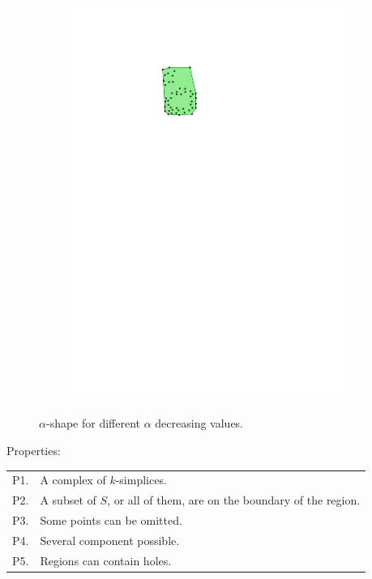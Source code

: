 \begin{figure}
\begin{subfigure}[b]{0.15\linewidth}
    \includegraphics[page=5,width=\textwidth]{figs/alphashape.pdf}
    \caption{}
  \end{subfigure}
  \qquad 
\caption{$\alpha$-shape for different $\alpha$ decreasing values.}
\label{fig:alphashape}
\end{figure}

Properties:
\\
\begin{tabular}{@{}ll@{}}
\toprule
P1. & A complex of $k$-simplices.  \\  
P2. & A subset of $S$, or all of them, are on the boundary of the region. \\ 
P3. & Some points can be omitted. \\ 
P4. & Several component possible.  \\ 
P5. & Regions can contain holes.  \\  
\bottomrule
\end{tabular}



